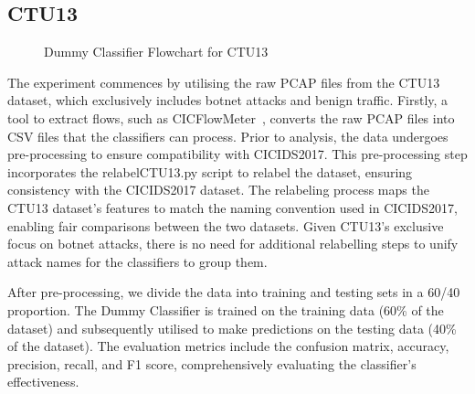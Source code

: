 \subsection{CTU13}\label{subsec:DummyClassifierCTU13}

\begin{figure}[H]
\centering
{}
\caption{Dummy Classifier Flowchart for CTU13}\label{fig:DummyRandomFlowCTU13}
\end{figure}

The experiment commences by utilising the raw PCAP files from the CTU13 dataset, which exclusively includes botnet attacks and benign traffic. Firstly, a tool to extract flows, such as CICFlowMeter~\cite{lashkari2017characterization}, converts the raw PCAP files into CSV files that the classifiers can process. Prior to analysis, the data undergoes pre-processing to ensure compatibility with CICIDS2017. This pre-processing step incorporates the relabelCTU13.py script to relabel the dataset, ensuring consistency with the CICIDS2017 dataset. The relabeling process maps the CTU13 dataset's features to match the naming convention used in CICIDS2017, enabling fair comparisons between the two datasets. Given CTU13's exclusive focus on botnet attacks, there is no need for additional relabelling steps to unify attack names for the classifiers to group them.

After pre-processing, we divide the data into training and testing sets in a 60/40 proportion. The Dummy Classifier is trained on the training data (60\% of the dataset) and subsequently utilised to make predictions on the testing data (40\% of the dataset). The evaluation metrics include the confusion matrix, accuracy, precision, recall, and F1 score, comprehensively evaluating the classifier's effectiveness.

